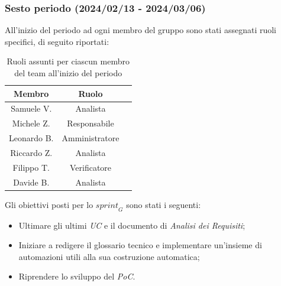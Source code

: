 \subsubsection{Sesto periodo (2024/02/13 - 2024/03/06)}
All'inizio del periodo ad ogni membro del gruppo sono stati assegnati ruoli specifici, di seguito riportati:
\begin{table}[H]
\centering
\begin{tabular}{|c|c|c|}
\hline
\textbf{Membro} & \textbf{Ruolo} \\
\hline
Samuele V. & Analista \\
\hline
Michele Z. & Responsabile \\
\hline
Leonardo B. & Amministratore \\
\hline
Riccardo Z. & Analista \\
\hline
Filippo T. & Verificatore \\
\hline
Davide B. & Analista \\
\hline
\end{tabular}
\caption{Ruoli assunti per ciascun membro del team all'inizio del periodo}
\end{table}

Gli obiettivi posti per lo $\textit{sprint}_G$ sono stati i seguenti:
\begin{itemize}
    \item Ultimare gli ultimi \emph{UC} e il documento di \emph{Analisi dei Requisiti};
    \item Iniziare a redigere il glossario tecnico e implementare un'insieme di automazioni utili alla sua costruzione automatica;
    \item Riprendere lo sviluppo del \emph{PoC}.
\end{itemize}


